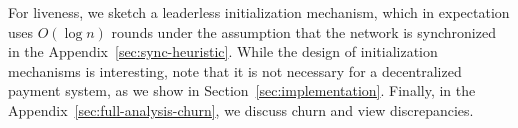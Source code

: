 \documentclass[letterpaper,twocolumn,10pt]{article}
\newcommand{\Oh}[1]{O(#1)}
\theoremstyle{definition}
\begin{document}
For liveness, we sketch a leaderless initialization mechanism, which in expectation uses $\Oh{\log{n}}$ rounds under the assumption that the network is synchronized in the Appendix~\ref{sec:sync-heuristic}. 
While the design of initialization mechanisms is interesting, note that it is not necessary for a decentralized payment system, as we show in Section~\ref{sec:implementation}.
Finally, in the Appendix~\ref{sec:full-analysis-churn}, we discuss churn and view discrepancies.


\end{document}

